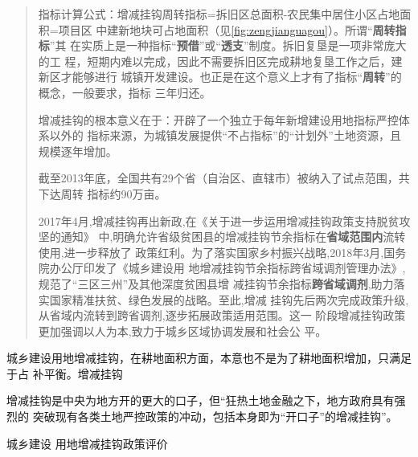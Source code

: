\begin{quotation}
  指标计算公式：增减挂钩周转指标=拆旧区总面积-农民集中居住小区占地面积=项目区
  中建新地块可占地面积（见\cref{fig:zengjianguagou}）。所谓“\textbf{周转指标}”其
  在实质上是一种指标“\textbf{预借}”或“\textbf{透支}”制度。拆旧复垦是一项非常庞大的工
  程，短期内难以完成，因此不需要拆旧区完成耕地复垦工作之后，建新区才能够进行
  城镇开发建设。也正是在这个意义上才有了指标“\textbf{周转}”的概念，一般要求，指标
  三年归还。

  增减挂钩的根本意义在于：开辟了一个独立于每年新增建设用地指标严控体系以外的
  指标来源，为城镇发展提供“不占指标”的“计划外”土地资源，且规模逐年增加。\cite{yangdi}

  截至2013年底，全国共有29个省（自治区、直辖市）被纳入了试点范围，共下达周转
  指标约90万亩。

  2017年4月,增减挂钩再出新政,在《关于进一步运用增减挂钩政策支持脱贫攻坚的通知》
  中,明确允许省级贫困县的增减挂钩节余指标在\textbf{省域范围内}流转使用,进一步释放了
  政策红利。为了落实国家乡村振兴战略,2018年3月,国务院办公厅印发了《城乡建设用
  地增减挂钩节余指标跨省域调剂管理办法》,规范了“三区三州”及其他深度贫困县增
  减挂钩节余指标\textbf{跨省域调剂},助力落实国家精准扶贫、绿色发展的战略。至此,增减
  挂钩先后两次完成政策升级,从省域内流转到跨省调剂,逐步拓展政策适用范围。这一
  阶段增减挂钩政策更加强调以人为本,致力于城乡区域协调发展和社会公
  平。\cite{zengjianzongshu}
\end{quotation}

城乡建设用地增减挂钩，在耕地面积方面，本意也不是为了耕地面积增加，只满足于占
补平衡。增减挂钩

增减挂钩是中央为地方开的更大的口子，但“狂热土地金融之下，地方政府具有强烈的
突破现有各类土地严控政策的冲动，包括本身即为“开口子”的增减挂钩”。

城乡建设
用地增减挂钩政策评价

